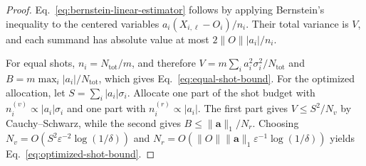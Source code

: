 \documentclass[aps,pra,reprint,groupedaddress,floatfix]{revtex4-2}
\newcommand{\eps}{\varepsilon}
\begin{document}
\begin{proof}
Eq.~\eqref{eq:bernstein-linear-estimator} follows by applying Bernstein's inequality to the centered variables $a_i(X_{i,\ell}- O_i)/n_i$. Their total variance is $V$, and each summand has absolute value at most $2\|O\||a_i|/n_i$.

For equal shots, $n_i=N_{\mathrm{tot}}/m$, and therefore $V=m\sum_i a_i^2\sigma_i^2/N_{\mathrm{tot}}$ and $B=m\max_i|a_i|/N_{\mathrm{tot}}$, which gives Eq.~\eqref{eq:equal-shot-bound}. For the optimized allocation, let $S=\sum_i |a_i|\sigma_i$. Allocate one part of the shot budget with $n_i^{(v)}\propto |a_i|\sigma_i$ and one part with $n_i^{(r)}\propto |a_i|$. The first part gives $V\le S^2/N_v$ by Cauchy--Schwarz, while the second gives $B\le \|\mathbf a\|_1/N_r$. Choosing $N_v=O(S^2\eps^{-2}\log(1/\delta))$ and $N_r=O(\|O\|\|\mathbf a\|_1\eps^{-1}\log(1/\delta))$ yields Eq.~\eqref{eq:optimized-shot-bound}.
\end{proof}
\end{document}

